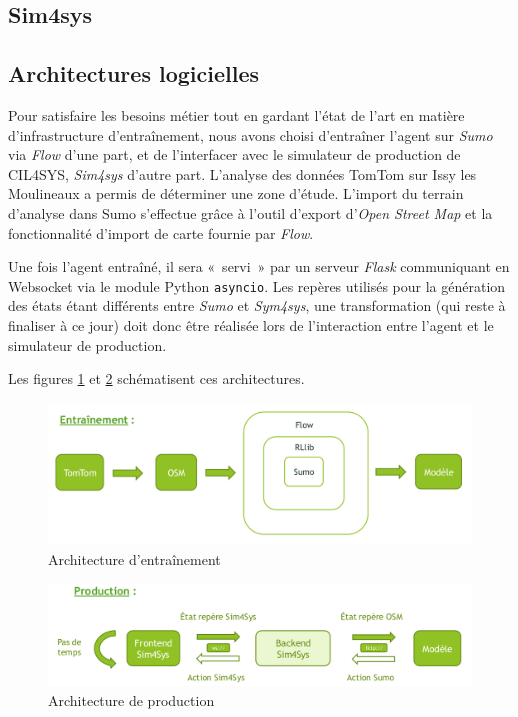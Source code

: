 \documentclass[11pt]{article}
\begin{document}
\subsection{Sim4sys}
\label{sec:org9da9a76}

\subsection{Architectures logicielles}
\label{sec:org9c28fad}

Pour satisfaire les besoins métier tout en gardant l'état de l'art en matière d'infrastructure d'entraînement, nous avons choisi d'entraîner l'agent sur \emph{Sumo} via \emph{Flow} d'une part, et de l'interfacer avec le simulateur de production de CIL4SYS, \emph{Sim4sys} d'autre part. L'analyse des données TomTom sur Issy les Moulineaux a permis de déterminer une zone d'étude. L'import du terrain d'analyse dans Sumo s'effectue grâce à l'outil d'export d'\emph{Open Street Map} et la fonctionnalité d'import de carte fournie par \emph{Flow}.

Une fois l'agent entraîné, il sera « servi » par un serveur \emph{Flask} communiquant en Websocket via le module Python \texttt{asyncio}. Les repères utilisés pour la génération des états étant différents entre \emph{Sumo} et \emph{Sym4sys}, une transformation (qui reste à finaliser à ce jour) doit donc être réalisée lors de l'interaction entre l'agent et le simulateur de production.

Les figures \ref{fig:train_arch} et  \ref{fig:prod_arch} schématisent ces architectures.

\begin{figure}[htbp]
\centering
\includegraphics[width=.9\linewidth]{./img/entrainement_arch.png}
\caption{\label{fig:train_arch}
Architecture d'entraînement}
\end{figure}

\begin{figure}[htbp]
\centering
\includegraphics[width=.9\linewidth]{./img/production.png}
\caption{\label{fig:prod_arch}
Architecture de production}
\end{figure}
\end{document}
